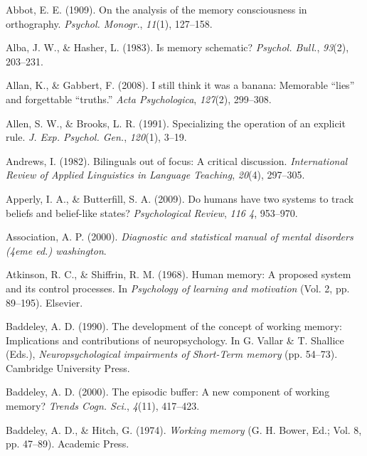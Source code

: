 \documentclass[
]{krantz}
\newlength{\cslhangindent}
\newenvironment{CSLReferences}[2] %
 {\begin{list}{}{%
  \setlength{\itemindent}{0pt}
  \setlength{\leftmargin}{0pt}
  \setlength{\parsep}{0pt}
  \ifodd #1
   \setlength{\leftmargin}{\cslhangindent}
   \setlength{\itemindent}{-1\cslhangindent}
  \fi
  \setlength{\itemsep}{#2\baselineskip}}}
 {\end{list}}
\begin{document}
\protect{}\label{refs}
\begin{CSLReferences}{1}{0}
Abbot, E. E. (1909). On the analysis of the memory consciousness in orthography. \emph{Psychol. Monogr.}, \emph{11}(1), 127--158.

Alba, J. W., \& Hasher, L. (1983). Is memory schematic? \emph{Psychol. Bull.}, \emph{93}(2), 203--231.

Allan, K., \& Gabbert, F. (2008). I still think it was a banana: Memorable {``lies''} and forgettable {``truths.''} \emph{Acta Psychologica}, \emph{127}(2), 299--308.

Allen, S. W., \& Brooks, L. R. (1991). Specializing the operation of an explicit rule. \emph{J. Exp. Psychol. Gen.}, \emph{120}(1), 3--19.

Andrews, I. (1982). Bilinguals out of focus: A critical discussion. \emph{International Review of Applied Linguistics in Language Teaching}, \emph{20}(4), 297--305.

Apperly, I. A., \& Butterfill, S. A. (2009). Do humans have two systems to track beliefs and belief-like states? \emph{Psychological Review}, \emph{116 4}, 953--970.

Association, A. P. (2000). \emph{Diagnostic and statistical manual of mental disorders (4eme ed.) washington}.

Atkinson, R. C., \& Shiffrin, R. M. (1968). Human memory: A proposed system and its control processes. In \emph{Psychology of learning and motivation} (Vol. 2, pp. 89--195). Elsevier.

Baddeley, A. D. (1990). The development of the concept of working memory: Implications and contributions of neuropsychology. In G. Vallar \& T. Shallice (Eds.), \emph{Neuropsychological impairments of {Short-Term} memory} (pp. 54--73). Cambridge University Press.

Baddeley, A. D. (2000). The episodic buffer: A new component of working memory? \emph{Trends Cogn. Sci.}, \emph{4}(11), 417--423.

Baddeley, A. D., \& Hitch, G. (1974). \emph{Working memory} (G. H. Bower, Ed.; Vol. 8, pp. 47--89). Academic Press.


\end{CSLReferences}
\end{document}
